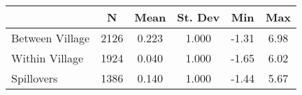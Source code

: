 \begin{tabular}{l*{5}{c}}\hline&\multicolumn{1}{c}{N}&\multicolumn{1}{c}{Mean}&\multicolumn{1}{c}{St. Dev}&\multicolumn{1}{c}{Min}&\multicolumn{1}{c}{Max}\\ \hline 
Between Village & 2126 & 0.223 & 1.000 & -1.31 & 6.98 \\
Within Village & 1924 & 0.040 & 1.000 & -1.65 & 6.02 \\
Spillovers & 1386 & 0.140 & 1.000 & -1.44 & 5.67 \\
\hline \end{tabular}
